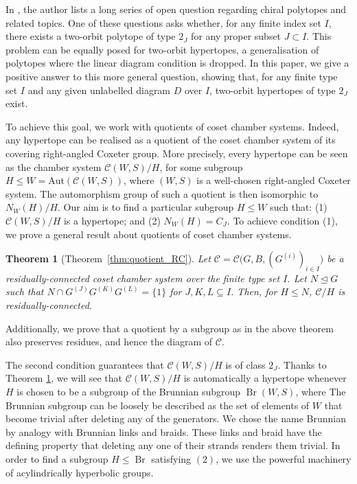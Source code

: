 \documentclass[11pt,letterpaper]{amsart}
\newtheorem{thmalpha}{Theorem}
\newcommand{\CC}{\mathcal{C}}
\newcommand{\Aut}{\mathrm{Aut}}
\newcommand{\C}{\mathcal{C}}
\newcommand{\Br}{\operatorname{Br}}
\begin{document}
In \cite{Pellicer_2025}, the author lists a long series of open question regarding chiral polytopes and related topics. One of these questions asks whether, for any finite index set $I$, there exists a two-orbit polytope of type $2_J$ for any proper subset $J \subset I$. 
This problem can be equally posed for two-orbit hypertopes, a generalisation of polytopes where the linear diagram condition is dropped.
In this paper, we give a positive answer to this more general question, showing that, for any finite type set $I$ and any given unlabelled diagram $D$ over $I$, two-orbit hypertopes of type $2_J$ exist. 

To achieve this goal, we work with quotients of coset chamber systems. Indeed, any hypertope can be realised as a quotient of the coset chamber system of its covering right-angled Coxeter group. More precisely, every hypertope can be seen as the chamber system $\C(W,S)/H$, for some subgroup $H\leq W = \Aut(\C(W,S))$, where $(W,S)$ is a well-chosen right-angled Coxeter system. The automorphism group of such a quotient is then isomorphic to $N_W(H)/H$. Our aim is to find a particular subgroup $H\leq W$ such that: (1) $\C(W,S)/H$ is a hypertope; and (2) $N_W(H) = C_J$.
To achieve condition (1), we prove a general result about quotients of coset chamber systems.
\begin{thmalpha}[Theorem~\ref{thm:quotient_RC}]\label{thm:A}
    Let $\CC=\CC\bigl(G,B,(G^{(i)})_{i\in I}\bigr)$
be a residually-connected coset chamber system over the finite type set $I$.  Let $N\trianglelefteq G$ such that $N\cap G^{(J)}G^{(K)}G^{(L)} = \{1\}$ for $J,K,L\subseteq I$. 
Then, for $H\leq N$, $\CC/H$ is
residually-connected.
\end{thmalpha}
Additionally, we prove that a quotient by a subgroup as in the above theorem also preserves residues, and hence the diagram of $\C$.

The second condition guarantees that $\C(W,S)/H$ is of class $2_J$.
Thanks to Theorem \ref{thm:A}, we will see that $\C(W,S)/H$ is automatically a hypertope whenever $H$ is chosen to be a subgroup of the Brunnian subgroup $\Br(W,S)$, where The Brunnian subgroup can be loosely be described as the set of elements of $W$ that become trivial after deleting any of the generators.
We chose the name Brunnian by analogy with Brunnian links and braids. These links and braid have the defining property that deleting any one of their strands renders them trivial. In order to find a subgroup $H \leq \Br$ satisfying $(2)$, we use the powerful machinery of acylindrically hyperbolic groups.
\end{document}
